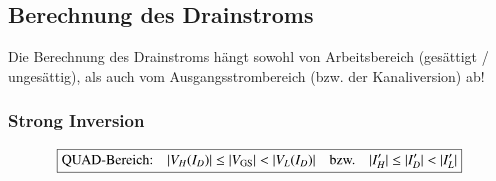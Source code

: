 


    








\subsection{Berechnung des Drainstroms}

Die Berechnung des Drainstroms hängt sowohl von Arbeitsbereich (gesättigt / ungesättig), als auch vom Ausgangsstrombereich (bzw. der Kanaliversion) ab!


\subsubsection{Strong Inversion}
\label{Strong Inversion}

\vspace{-0.3cm}

\[ \boxed{ \text{QUAD-Bereich:} \quad |V_H(I_D)| \leq |V_{\rm GS}| < |V_L(I_D)| \quad \text{bzw.} \quad |I_H'| \leq |I_D'| < |I_L'| } \]  %

